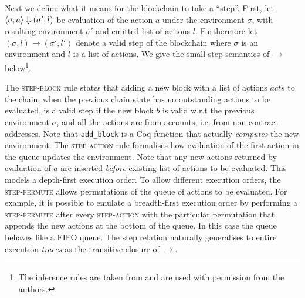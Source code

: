 \documentclass[twoside,11pt,openright]{report}
\newcommand{\coq}[1]{\texttt{#1}}
\begin{document}
\newcommand{\cstep}[4]{(#1, #2) \rightarrow (#3, #4)}
Next we define what it means for the blockchain to take a ``step''. First, let $\langle \sigma, a \rangle \mathrel{\Downarrow} (\sigma', l)$ be evaluation of the action $a$ under the environment $\sigma$, with resulting environment $\sigma'$ and emitted list of actions $l$. Furthermore let $\cstep{\sigma}{l}{\sigma'}{l'}$ denote a valid step of the blockchain where $\sigma$ is an environment and $l$ is a list of actions. We give the small-step semantics of $\rightarrow$ below\footnote{The inference rules are taken from \cite{nielsen2019smart} and are used with permission from the authors.}. 
\begin{figure}[h]
\end{figure}
The \textsc{step-block} rule states that adding a new block with a list of actions $acts$ to the chain, when the previous chain state has no outstanding actions to be evaluated, is a valid step if the new block $b$ is valid w.r.t the previous environment $\sigma$, and all the actions are from accounts, i.e. from non-contract addresses. Note that \coq{add\_block} is a Coq function that actually \textit{computes} the new environment. The \textsc{step-action} rule formalises how evaluation of the first action in the queue updates the environment. Note that any new actions returned by evaluation of $a$ are inserted \textit{before} existing list of actions to be evaluated. This models a depth-first execution order. To allow different execution orders, the \textsc{step-permute} allows permutations of the queue of actions to be evaluated. For example, it is possible to emulate a breadth-first execution order by performing a \textsc{step-permute} after every \textsc{step-action} with the particular permutation that appends the new actions at the bottom of the queue. In this case the queue behaves like a FIFO queue. The step relation naturally generalises to entire execution \textit{traces} as the transitive closure of $\rightarrow$.
\end{document}
